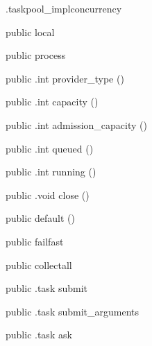 \begin{CrexxClass}{.taskpool\_impl}{concurrency}

  \begin{Hierarchy}
  \end{Hierarchy}

  \begin{Members}

    \Factory
      {public}
      {local}
      {}

    \Factory
      {public}
      {process}
      {}

    \Method
      {public}
      {.int}
      {provider\_type}
      {()}

    \Method
      {public}
      {.int}
      {capacity}
      {()}

    \Method
      {public}
      {.int}
      {admission\_capacity}
      {()}

    \Method
      {public}
      {.int}
      {queued}
      {()}

    \Method
      {public}
      {.int}
      {running}
      {()}

    \Method
      {public}
      {.void}
      {close}
      {()}

    \Factory
      {public}
      {default}
      {()}

    \Factory
      {public}
      {failfast}
      {}

    \Factory
      {public}
      {collectall}
      {}

    \Method
      {public}
      {.task}
      {submit}
      {}

    \Method
      {public}
      {.task}
      {submit\_arguments}
      {}

    \Method
      {public}
      {.task}
      {ask}
      {}


\end{Members}
\end{CrexxClass}

